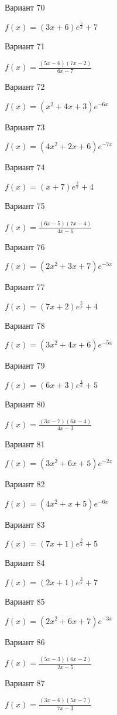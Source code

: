 \documentclass[11pt]{report}
\begin{document}
Вариант 70

$f(x) = \left(3 x + 6\right) e^{\frac{5}{x}} + 7$

Вариант 71

$f(x) = \frac{\left(5 x - 6\right) \left(7 x - 2\right)}{6 x - 7}$

Вариант 72

$f(x) = \left(x^{2} + 4 x + 3\right) e^{- 6 x}$

Вариант 73

$f(x) = \left(4 x^{2} + 2 x + 6\right) e^{- 7 x}$

Вариант 74

$f(x) = \left(x + 7\right) e^{\frac{2}{x}} + 4$

Вариант 75

$f(x) = \frac{\left(6 x - 5\right) \left(7 x - 4\right)}{4 x - 6}$

Вариант 76

$f(x) = \left(2 x^{2} + 3 x + 7\right) e^{- 5 x}$

Вариант 77

$f(x) = \left(7 x + 2\right) e^{\frac{5}{x}} + 4$

Вариант 78

$f(x) = \left(3 x^{2} + 4 x + 6\right) e^{- 5 x}$

Вариант 79

$f(x) = \left(6 x + 3\right) e^{\frac{4}{x}} + 5$

Вариант 80

$f(x) = \frac{\left(3 x - 7\right) \left(6 x - 4\right)}{4 x - 3}$

Вариант 81

$f(x) = \left(3 x^{2} + 6 x + 5\right) e^{- 2 x}$

Вариант 82

$f(x) = \left(4 x^{2} + x + 5\right) e^{- 6 x}$

Вариант 83

$f(x) = \left(7 x + 1\right) e^{\frac{2}{x}} + 5$

Вариант 84

$f(x) = \left(2 x + 1\right) e^{\frac{3}{x}} + 7$

Вариант 85

$f(x) = \left(2 x^{2} + 6 x + 7\right) e^{- 3 x}$

Вариант 86

$f(x) = \frac{\left(5 x - 3\right) \left(6 x - 2\right)}{2 x - 5}$

Вариант 87

$f(x) = \frac{\left(3 x - 6\right) \left(5 x - 7\right)}{7 x - 3}$
\end{document}
